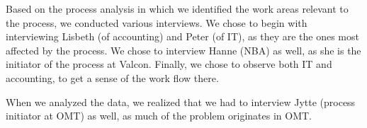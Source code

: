 Based on the process analysis in which we identified the work areas relevant to the process, we conducted various interviews.
We chose to begin with interviewing Lisbeth (of accounting) and Peter (of IT), as they are the ones most affected by the process.
We chose to interview Hanne (NBA) as well, as she is the initiator of the process at Valcon.
Finally, we chose to observe both IT and accounting, to get a sense of the work flow there.

When we analyzed the data, we realized that we had to interview Jytte (process initiator at OMT) as well, as much of the problem originates in OMT.
